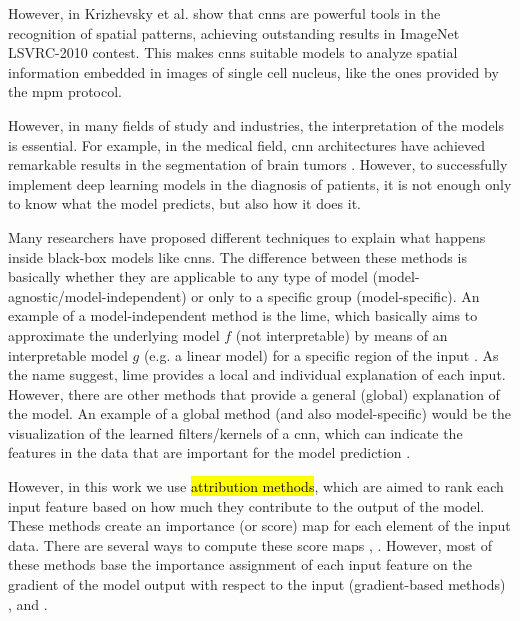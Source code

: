 However, in \cite{krizhevsky2012imagenet} Krizhevsky et al. show that \glspl{cnn} are powerful tools in the recognition of spatial patterns, achieving outstanding results in ImageNet LSVRC-2010 contest.
This makes \glspl{cnn} suitable models to analyze spatial information embedded in images of single cell nucleus, like the ones provided by the \gls{mpm} protocol.

However, in many fields of study and industries, the interpretation of the models is essential. For example, in the medical field, \gls{cnn} architectures have achieved remarkable results in the segmentation of brain tumors \cite{saleem2021visual}. However, to successfully implement deep learning models in the diagnosis of patients, it is not enough only to know what the model predicts, but also how it does it.

Many researchers have proposed different techniques to explain what happens inside black-box models like \glspl{cnn}.
The difference between these methods is basically whether they are applicable to any type of model (model-agnostic/model-independent) or only to a specific group (model-specific).
An example of a model-independent method is the \gls{lime}, which basically aims to approximate the underlying model $f$ (not interpretable) by means of an interpretable model $g$ (e.g. a linear model) for a specific region of the input \cite{ribeiro2016model}. As the name suggest, \gls{lime} provides a local and individual explanation of each input.
However, there are other methods that provide a general (global) explanation of the model. An example of a global method (and also model-specific) would be the visualization of the learned filters/kernels of a \gls{cnn}, which can indicate the features in the data that are important for the model prediction \cite{zeiler2014visualizing}.

However, in this work we use \hl{attribution methods}, which are aimed to rank each input feature based on how much they contribute to the output of the model.
These methods create an importance (or score) map for each element of the input data. There are several ways to compute these score maps \cite{JMLR:v11:baehrens10a}, \cite{ShrikumarGSK16}. However, most of these methods base the importance assignment of each input feature on the gradient of the model output with respect to the input (gradient-based methods) \cite{SimonyanVZ13}, \cite{BinderMBMS16} and \cite{Springenberg}.

